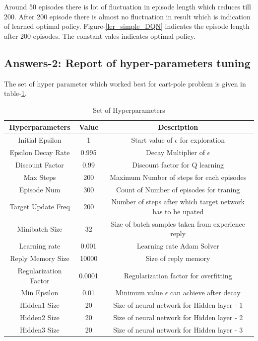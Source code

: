 \documentclass[preprint,12pt]{elsarticle}
\begin{document}
  Around 50 episodes there is lot of fluctuation in episode length which reduces till 200. After 200 episode there is almost no fluctuation in result which is indication of learned optimal policy. Figure-\ref{ler_simple_DQN} indicates the episode length after 200 episodes. The constant vales indicates optimal policy.

\subsection{Answers-2: Report of hyper-parameters tuning}

The set of hyper parameter which worked best for cart-pole problem is given in table-\ref{tab:hyperPara}.

\begin{table}[H]
	\begin{tabular}{|c|c|c|}
		\hline
		\textbf{Hyperparameters} & \textbf{Value} & \textbf{Description} \\ \hline
		Initial Epsilon & 1 & Start value of $\epsilon $ for exploration \\ \hline
		Epsilon Decay Rate & 0.995 & Decay Multiplier of $\epsilon$ \\ \hline
		Discount Factor & 0.99 & Discount factor for Q learning \\ \hline
		Max Steps & 200 & Maximum Number of steps for each episodes \\ \hline
		Episode Num & 300 & Count of Number of episodes for traning \\ \hline
		Target Update Freq & 200 & Number of steps after which target network has to be upated \\ \hline
		Minibatch Size & 32 & Size of batch samples taken from experience reply \\ \hline
		Learning rate & 0.001 & Learning rate Adam Solver \\ \hline
		Reply Memory Size & 10000 & Size of reply memory \\ \hline
		Regularization Factor & 0.0001 & Regularization factor for overfitting \\ \hline
		Min Epsilon & 0.01 & Minimum value $\epsilon$ can achieve after decay \\ \hline
		Hidden1 Size & 20 & Size of neural network for Hidden layer - 1 \\ \hline
		Hidden2 Size & 20 & Size of neural network for Hidden layer - 2 \\ \hline
		Hidden3 Size & 20 & Size of neural network for Hidden layer - 3 \\ \hline
	\end{tabular}
	\vspace{1mm}
	\caption{Set of Hyperparameters}
	\label{tab:hyperPara}
\end{table}
\end{document}
